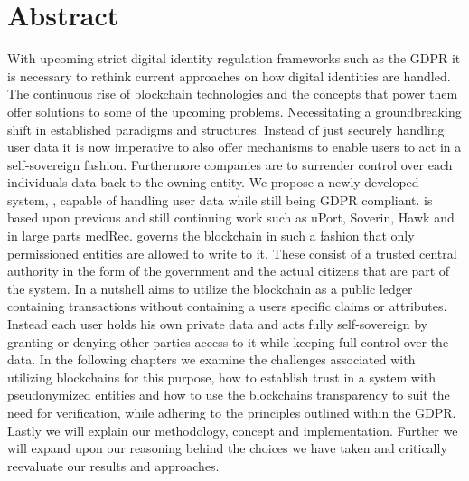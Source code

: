 \chapter*{Abstract}
\label{cha:abstract}

With upcoming strict digital identity regulation frameworks such as the GDPR\cite{gdpr} it is necessary to 
rethink current approaches on how digital identities are handled.
The continuous rise of blockchain technologies and the concepts that power
them offer solutions to some of the upcoming problems.
Necessitating a groundbreaking shift in established paradigms and structures.
Instead of just securely handling user data it is now imperative to also offer mechanisms to enable users to act
in a self-sovereign fashion.
Furthermore companies are to surrender control over each individuals data back to the owning entity.
We propose a newly developed system, \projectName{}, capable of handling user data while still being GDPR compliant.
\projectName{} is based upon previous and still continuing work such as uPort\cite{uPortWhitePaper},
Soverin\cite{}, Hawk\cite{} and in large parts medRec\cite{azaria2016medrec}.
\projectName{} governs the blockchain in such a fashion that only permissioned entities are allowed to write to it.
These consist of a trusted central authority in the form of the government and the actual citizens
that are part of the system.
In a nutshell \projectName{} aims to utilize the blockchain as a public ledger containing transactions without
containing a users specific claims or attributes.
Instead each user holds his own private data and acts fully self-sovereign by granting or denying other parties access
to it while keeping full control over the data.
In the following chapters we examine the challenges associated with utilizing blockchains for this purpose,
how to establish trust in a system with pseudonymized entities and how to use the blockchains transparency to suit the
need for verification, while adhering to the principles outlined within the GDPR\cite{gdpr}.
Lastly we will explain our methodology, concept and implementation.
Further we will expand upon our reasoning behind the choices we have taken and critically reevaluate our results and approaches.